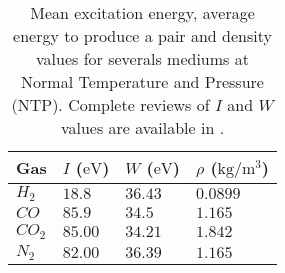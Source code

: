 \begin{table}[ht]
	\centering
	\caption[Mean excitation energy, average energy to produce a pair and density values for severals mediums at Normal Temperature and Pressure (NTP)]
	{Mean excitation energy, average energy to produce a pair and density values for severals mediums at Normal Temperature and Pressure (NTP). Complete reviews of \(I\) and \(W\) values are available in \cite{Kamakura2006}\cite{Bichsel1979}.}
	\label{chap3:WandI}
	\begin{tabular}{llll}
		\toprule
		Gas        & \(I\) (\(\mathrm{eV}\)) & \(W\) (\(\mathrm{eV}\)) & \(\rho\) (\(\mathrm{kg/m^{3}}\)) \\
		\midrule
		\(H_{2}\)  & \(18.8\)                & \(36.43\)               & \(0.0899\)                       \\
		\(CO\)     & \(85.9\)                & \(34.5\)                & \(1.165\)                        \\
		\(CO_{2}\) & \(85.00\)               & \(34.21\)               & \(1.842\)                        \\
		\(N_{2}\)  & \(82.00\)               & \(36.39\)               & \(1.165\)                        \\
		\bottomrule
	\end{tabular}
\end{table}